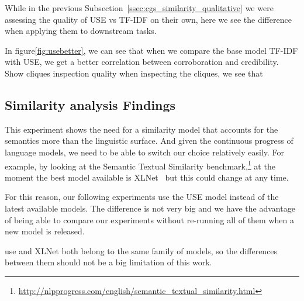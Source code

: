 While in the previous Subsection~\ref{ssec:cgs_similarity_qualitative} we were assessing the quality of USE vs TF-IDF on their own, here we see the difference when applying them to downstream tasks.



In figure\ref{fig:usebetter}, we can see that when we compare the base model TF-IDF with USE, we get a better correlation between corroboration and credibility.
Show cliques inspection quality
when inspecting the cliques, we see that 



\subsection{\statusgreen Similarity analysis Findings}
\label{ssec:cgs_similarity_conclusion}

This experiment shows the need for a similarity model that accounts for the semantics more than the linguistic surface. And given the continuous progress of language models, we need to be able to switch our choice relatively easily.
For example, by looking at the Semantic Textual Similarity benchmark,\footnote{\url{http://nlpprogress.com/english/semantic_textual_similarity.html}} at the moment the best model available is XLNet~\citep{yang2019xlnet} but this could change at any time.

For this reason, our following experiments use the USE model instead of the latest available models. The difference is not very big and we have the advantage of being able to compare our experiments without re-running all of them when a new model is released.

\acrshort{use} and XLNet both belong to the same family of models, so the differences between them should not be a big limitation of this work.




